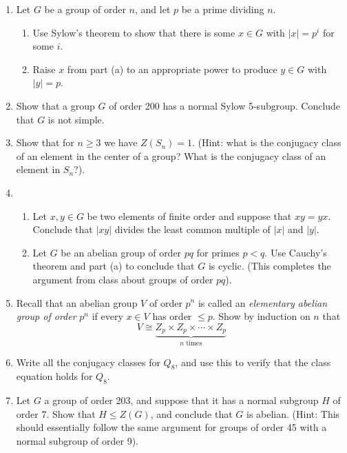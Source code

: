 \documentclass[11pt]{article}
\begin{document}
\begin{enumerate}
  \item{
  Let $G$ be a group of order $n$, and let $p$ be a prime dividing $n$.
  \begin{enumerate}
    \item{
    Use Sylow's theorem to show that there is some $x\in G$ with $|x| = p^i$ for some $i$.
    }
    \item{
    Raise $x$ from part (a) to an appropriate power to produce $y\in G$ with $|y| = p$.
    }
  \end{enumerate}
  }
  \item{
  Show that a group $G$ of order 200 has a normal Sylow 5-subgroup.  Conclude that $G$ is not simple.
  }
  \item{
  Show that for $n\ge3$ we have $Z(S_n)=1$. (Hint: what is the conjugacy class of an element in the center of a group?  What is the conjugacy class of an element in $S_n$?).
  }
  \item{
  \begin{enumerate}
    \item{
    Let $x,y\in G$ be two elements of finite order and suppose that $xy=yx$.  Conclude that $|xy|$ divides the least common multiple of $|x|$ and $|y|$.
    }
    \item{
    Let $G$ be an abelian group of order $pq$ for primes $p<q$.  Use Cauchy's theorem and part (a) to conclude that $G$ is cyclic.  (This completes the argument from class about groups of order $pq$).
    }
  \end{enumerate}
  }
  \item{
  Recall that an abelian group $V$ of order $p^n$ is called an \textit{elementary abelian group of order }$p^n$ if every $x\in V$ has order $\le p$.  Show by induction on $n$ that
  \[V\cong\underbrace{Z_p\times Z_p\times\cdots\times Z_p}_{n \text{ times}}\]

  }
  \item{
  Write all the conjugacy classes for $Q_8$, and use this to verify that the class equation holds for $Q_8$.
  }
  \item{
  Let $G$ a group of order 203, and suppose that it has a normal subgroup $H$ of order 7.  Show that $H\le Z(G)$, and conclude that $G$ is abelian. (Hint: This should essentially follow the same argument for groups of order 45 with a normal subgroup of order 9).
  }
\end{enumerate}
\end{document}
